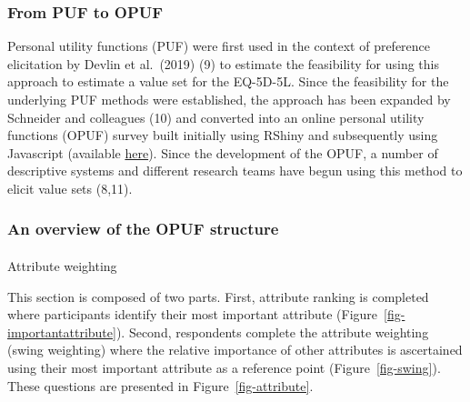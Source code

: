 \documentclass[
  letterpaper,
  DIV=11,
  numbers=noendperiod]{scrartcl}
\makeatletter
\let\oldparagraph\paragraph
\renewcommand{\paragraph}{
    \@ifstar
      \xxxParagraphStar
      \xxxParagraphNoStar
  }
\newcommand{\xxxParagraphStar}[1]{\oldparagraph*{#1}\mbox{}}
\newcommand{\xxxParagraphNoStar}[1]{\oldparagraph{#1}\mbox{}}
\makeatother
\begin{document}
\subsubsection{From PUF to OPUF}\label{from-puf-to-opuf}

Personal utility functions (PUF) were first used in the context of
preference elicitation by Devlin et al.~(2019) (9) to estimate the
feasibility for using this approach to estimate a value set for the
EQ-5D-5L. Since the feasibility for the underlying PUF methods were
established, the approach has been expanded by Schneider and colleagues
(10) and converted into an online personal utility functions (OPUF)
survey built initially using RShiny and subsequently using Javascript
(available \href{https://eq5d5l.me}{here}). Since the development of the
OPUF, a number of descriptive systems and different research teams have
begun using this method to elicit value sets (8,11).

\subsubsection{An overview of the OPUF
structure}\label{an-overview-of-the-opuf-structure}

\paragraph{Attribute weighting}\label{attribute-weighting}

This section is composed of two parts. First, attribute ranking is
completed where participants identify their most important attribute
(Figure~\ref{fig-importantattribute}). Second, respondents complete the
attribute weighting (swing weighting) where the relative importance of
other attributes is ascertained using their most important attribute as
a reference point (Figure~\ref{fig-swing}). These questions are
presented in Figure~\ref{fig-attribute}.
\end{document}
